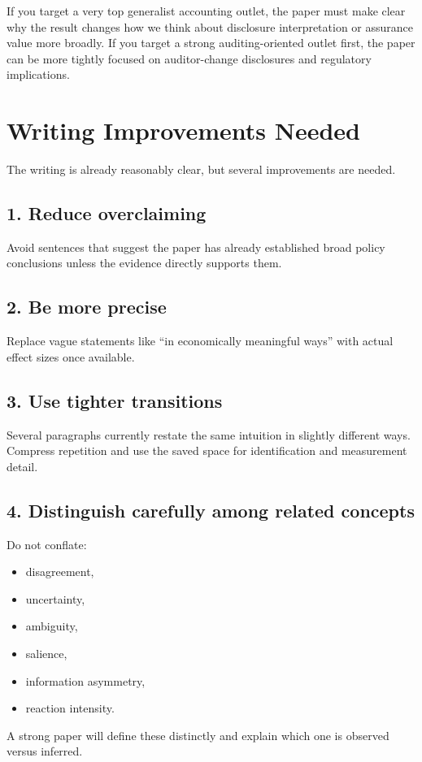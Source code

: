\documentclass[12pt]{article}
\begin{document}
If you target a very top generalist accounting outlet, the paper must make clear why the result changes how we think about disclosure interpretation or assurance value more broadly. If you target a strong auditing-oriented outlet first, the paper can be more tightly focused on auditor-change disclosures and regulatory implications.

\section{Writing Improvements Needed}
The writing is already reasonably clear, but several improvements are needed.

\subsection*{1. Reduce overclaiming}
Avoid sentences that suggest the paper has already established broad policy conclusions unless the evidence directly supports them.

\subsection*{2. Be more precise}
Replace vague statements like ``in economically meaningful ways'' with actual effect sizes once available.

\subsection*{3. Use tighter transitions}
Several paragraphs currently restate the same intuition in slightly different ways. Compress repetition and use the saved space for identification and measurement detail.

\subsection*{4. Distinguish carefully among related concepts}
Do not conflate:
\begin{itemize}[leftmargin=2em]
    \item disagreement,
    \item uncertainty,
    \item ambiguity,
    \item salience,
    \item information asymmetry,
    \item reaction intensity.
\end{itemize}
A strong paper will define these distinctly and explain which one is observed versus inferred.
\end{document}
